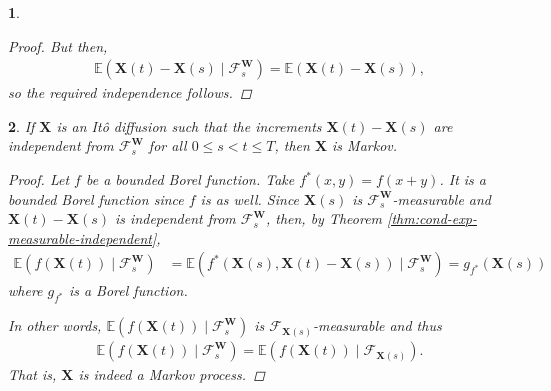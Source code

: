 \documentclass[english]{article}
\numberwithin{equation}{section}
\numberwithin{figure}{section}
\theoremstyle{bolddescit}
\newtheorem{theorem}{\protect\theoremname}[section]
\theoremstyle{definition}
\theoremstyle{definition}
\theoremstyle{plain}
\newtheorem{lemma}[theorem]{\protect\lemmaname}
\theoremstyle{plain}
\theoremstyle{bolddesc}
\theoremstyle{plain}
\theoremstyle{remark}
\providecommand{\lemmaname}{Lemma}
\providecommand{\theoremname}{Theorem}
\begin{document}
\begin{lemma}
\begin{proof}
    But then,
    \begin{align*}
      \mathbb{E}(\mathbf{X}(t) - \mathbf{X}(s) \mid \mathcal{F}^\mathbf{W}_s)
      = \mathbb{E}(\mathbf{X}(t) - \mathbf{X}(s)),
    \end{align*}
    so the required independence follows.
  \end{proof}
\end{lemma}

\begin{theorem}\label{thm:fp-ito-diffusion-markov}
  If $\mathbf{X}$ is an It\^o diffusion such that the increments $\mathbf{X}(t) - \mathbf{X}(s)$ are independent from $\mathcal{F}^\mathbf{W}_s$ for all $0 \le s < t \le T$, then $\mathbf{X}$ is Markov.

  \begin{proof}
    Let $f$ be a bounded Borel function. Take $f^*(x,y) = f(x+y)$. It is a bounded Borel function since $f$ is as well. Since $\mathbf{X}(s)$ is $\mathcal{F}^\mathbf{W}_s$-measurable and $\mathbf{X}(t) - \mathbf{X}(s)$ is independent from $\mathcal{F}^\mathbf{W}_s$, then, by Theorem \ref{thm:cond-exp-measurable-independent},
    \begin{align*}
      \mathbb{E}(f(\mathbf{X}(t)) \mid \mathcal{F}^\mathbf{W}_s)
      &= \mathbb{E}(f^*(\mathbf{X}(s), \mathbf{X}(t) - \mathbf{X}(s)) \mid \mathcal{F}^\mathbf{W}_s)
      = g_{f^*}(\mathbf{X}(s))
    \end{align*}
    where $g_{f^*}$ is a Borel function.

    In other words, $\mathbb{E}(f(\mathbf{X}(t)) \mid \mathcal{F}^\mathbf{W}_s)$ is $\mathcal{F}_{\mathbf{X}(s)}$-measurable and thus
    \begin{align*}
      \mathbb{E}(f(\mathbf{X}(t)) \mid \mathcal{F}^\mathbf{W}_{s})
      = \mathbb{E}(f(\mathbf{X}(t)) \mid \mathcal{F}_{\mathbf{X}(s)}).
    \end{align*}
    That is, $\mathbf{X}$ is indeed a Markov process.
  \end{proof}
\end{theorem}
\end{document}
